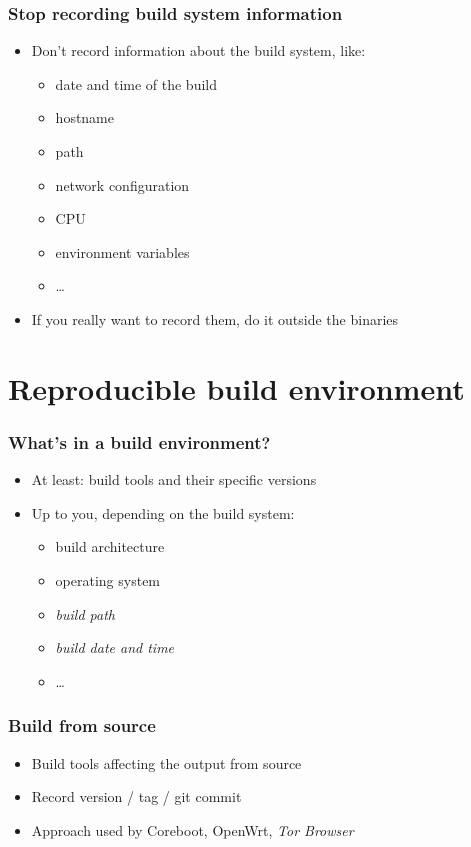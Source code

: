 \documentclass[14pt,aspectratio=169]{beamer}
\begin{document}
\begin{frame}
 \frametitle{Stop recording build system information}

 \begin{itemize}
  \item Don't record information about the build system, like:
   \begin{itemize}
    \item date and time of the build
    \item hostname
    \item path
    \item network configuration
    \item CPU
    \item environment variables
    \item …
   \end{itemize}
  \item<2> If you really want to record them, do it outside the binaries
 \end{itemize}
\end{frame}

\section{Reproducible build environment}

\begin{frame}
 \frametitle{What's in a build environment?}

 \begin{itemize}
  \item At least: build tools and their specific versions
  \item<2> Up to you, depending on the build system:
   \begin{itemize}
    \item build architecture
    \item operating system
    \item \textit{build path}
    \item \textit{build date and time}
    \item …
   \end{itemize}
 \end{itemize}
\end{frame}

\begin{frame}
 \frametitle{Build from source}

 \begin{itemize}
  \item Build tools affecting the output from source
  \item Record version / tag / git commit
  \item Approach used by Coreboot, OpenWrt, \textit{Tor Browser}
 \end{itemize}
\end{frame}
\end{document}
